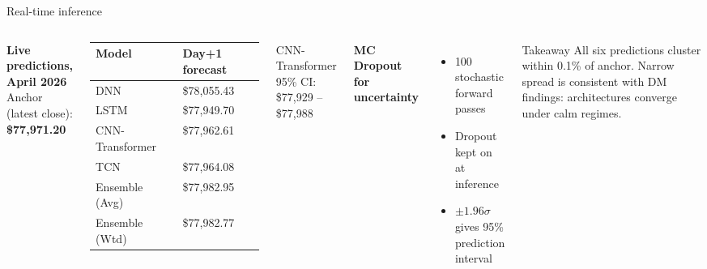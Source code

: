 \documentclass[aspectratio=169]{beamer}
\begin{document}
\begin{frame}{Real-time inference}
\begin{columns}[T,onlytextwidth]
\textbf{Live predictions, April 2026}
\\[0.2cm] Anchor (latest close): \textbf{\$77{,}971.20}
\\[0.15cm]
\small
\begin{tabular}{ll}
\toprule
\textbf{Model} & \textbf{Day+1 forecast} \\
\midrule
DNN              & \$78{,}055.43 \\
LSTM             & \$77{,}949.70 \\
CNN-Transformer  & \$77{,}962.61 \\
TCN              & \$77{,}964.08 \\
\rowcolor{accentgreen!15}
Ensemble (Avg)   & \$77{,}982.95 \\
Ensemble (Wtd)   & \$77{,}982.77 \\
\bottomrule
\end{tabular}

\vspace{0.2cm}
\scriptsize CNN-Transformer 95\% CI: \$77{,}929 -- \$77{,}988

\textbf{MC Dropout for uncertainty}
\begin{itemize}\small
  \item 100 stochastic forward passes
  \item Dropout kept on at inference
  \item $\pm 1.96\sigma$ gives 95\% prediction interval
\end{itemize}

\vspace{0.3cm}
\begin{block}{Takeaway}
\footnotesize
All six predictions cluster within 0.1\% of anchor. Narrow spread is consistent with DM findings: architectures converge under calm regimes.
\end{block}
\end{columns}
\end{frame}
\end{document}
